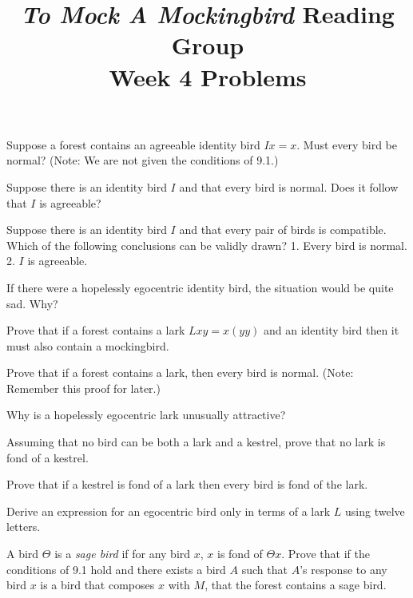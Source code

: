 \documentclass[12pt, letterpaper]{article}
\title{\emph{To Mock A Mockingbird} Reading Group\\Week 4 Problems}
\begin{document}
\maketitle

\disclaimer

\begin{prob}{9.20}
Suppose a forest contains an agreeable identity bird $Ix = x$. Must every bird be normal? (Note: We are not given the conditions of 9.1.)
\end{prob}

\begin{prob}{9.21}
Suppose there is an identity bird $I$ and that every bird is normal. Does it follow that $I$ is agreeable?
\end{prob}

\begin{prob}{9.22}
Suppose there is an identity bird $I$ and that every pair of birds is compatible. Which of the following conclusions can be validly drawn? 1. Every bird is normal. 2. $I$ is agreeable.
\end{prob}

\begin{prob}{9.23}
If there were a hopelessly egocentric identity bird, the situation would be quite sad. Why?
\end{prob}

\begin{prob}{9.24}
Prove that if a forest contains a lark $Lxy = x(yy)$ and an identity bird then it must also contain a mockingbird.
\end{prob}

\begin{prob}{9.25}
Prove that if a forest contains a lark, then every bird is normal. (Note: Remember this proof for later.)
\end{prob}

\begin{prob}{9.26}
Why is a hopelessly egocentric lark unusually attractive?
\end{prob}

\begin{prob}{9.27}
Assuming that no bird can be both a lark and a kestrel, prove that no lark is fond of a kestrel.
\end{prob}

\begin{prob}{9.28}
Prove that if a kestrel is fond of a lark then every bird is fond of the lark.
\end{prob}

\begin{prob}{9.29}
Derive an expression for an egocentric bird only in terms of a lark $L$ using twelve letters.
\end{prob}

\begin{prob}{10.1}
A bird $\Theta$ is a \emph{sage bird} if for any bird $x$, $x$ is fond of $\Theta x$. Prove that if the conditions of 9.1 hold and there exists a bird $A$ such that $A$'s response to any bird $x$ is a bird that composes $x$ with $M$, that the forest contains a sage bird.
\end{prob}
\end{document}
